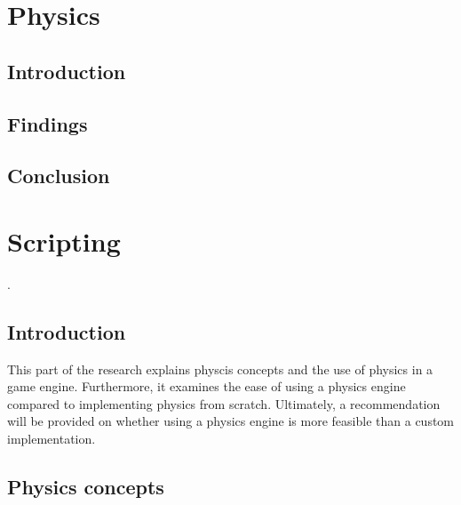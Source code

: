 \documentclass{projdoc}
\begin{document}
\section{Physics}

\subsection{Introduction}

\subsection{Findings}

\subsection{Conclusion}

\section{Scripting}

.

\subsection{Introduction}
This part of the research explains physcis concepts and the use of physics in a game engine. Furthermore, it examines the ease of using a physics engine compared to implementing physics from scratch. Ultimately, a recommendation will be provided on whether using a physics engine is more feasible than a custom implementation.


\subsection{Physics concepts}


\end{document}
